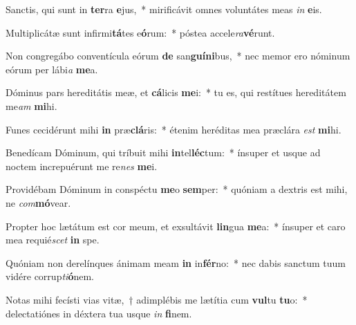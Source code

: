 \item Sanctis, qui sunt in \textbf{ter}ra \textbf{e}jus,~* mirificávit omnes voluntátes meas \textit{in} \textbf{e}is.
\item Multiplicátæ sunt infirmi\textbf{tá}tes e\textbf{ó}rum:~* póstea accele\textit{ra}\textbf{vé}runt.
\item Non congregábo conventícula eórum \textbf{de} san\textbf{guí}\textbf{ni}bus,~* nec memor ero nóminum eórum per lábi\textit{a} \textbf{me}a.
\item Dóminus pars hereditátis meæ, et \textbf{cá}licis \textbf{me}i:~* tu es, qui restítues hereditátem me\textit{am} \textbf{mi}hi.
\item Funes cecidérunt mihi \textbf{in} præ\textbf{clá}ris:~* étenim heréditas mea præclára \textit{est} \textbf{mi}hi.
\item Benedícam Dóminum, qui tríbuit mihi \textbf{in}tel\textbf{léc}tum:~* ínsuper et usque ad noctem increpuérunt me re\textit{nes} \textbf{me}i.
\item Providébam Dóminum in conspéctu \textbf{me}o \textbf{sem}per:~* quóniam a dextris est mihi, ne \textit{com}\textbf{mó}vear.
\item Propter hoc lætátum est cor meum, et exsultávit \textbf{lin}gua \textbf{me}a:~* ínsuper et caro mea requié\textit{scet} \textbf{in} spe.
\item Quóniam non derelínques ánimam meam \textbf{in} in\textbf{fér}no:~* nec dabis sanctum tuum vidére corrup\textit{ti}\textbf{ó}nem.
\item Notas mihi fecísti vias vitæ,~† adimplébis me lætítia cum \textbf{vul}tu \textbf{tu}o:~* delectatiónes in déxtera tua usque \textit{in} \textbf{fi}nem.
